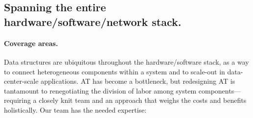 \subsection{Spanning the entire hardware/software/network stack.}


\paragraph{Coverage areas.} Data structures are ubiquitous throughout the
hardware/software stack, as a way to connect heterogeneous components within a
system and to scale-out in data-center-scale applications.  AT has become a
bottleneck, but redesigning AT is tantamount to renegotiating the division of
labor among system components---requiring a closely knit team and an approach
that weighs the costs and benefits holistically.
Our team has the needed expertise:


